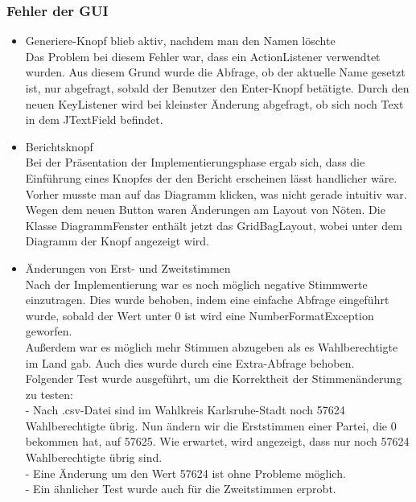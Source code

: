 \documentclass[12pt,a4paper,titlepage]{article}
\begin{document}
\subsubsection{Fehler der GUI}
\begin{itemize}
\item Generiere-Knopf blieb aktiv, nachdem man den Namen löschte \\
Das Problem bei diesem Fehler war, dass ein ActionListener verwendtet wurden. Aus diesem Grund wurde die
Abfrage, ob der aktuelle Name gesetzt ist, nur abgefragt, sobald der Benutzer den Enter-Knopf betätigte.
Durch den neuen KeyListener wird bei kleinster Änderung abgefragt, ob sich noch Text in dem JTextField befindet. \\

\item Berichtsknopf \\
Bei der Präsentation der Implementierungsphase ergab sich, dass die Einführung eines Knopfes der den Bericht erscheinen
lässt handlicher wäre. Vorher musste man auf das Diagramm klicken, was nicht gerade intuitiv war. \\
Wegen dem neuen Button waren Änderungen am Layout von Nöten. Die Klasse DiagrammFenster enthält jetzt das GridBagLayout,
wobei unter dem Diagramm der Knopf angezeigt wird. \\

\item Änderungen von Erst- und Zweitstimmen \\
Nach der Implementierung war es noch möglich negative Stimmwerte einzutragen. Dies wurde behoben, indem eine einfache Abfrage eingeführt wurde, sobald der Wert unter 0 ist wird eine NumberFormatException geworfen. \\
Außerdem war es möglich mehr Stimmen abzugeben als es Wahlberechtigte im Land gab. Auch dies wurde durch eine Extra-Abfrage behoben. \\
Folgender Test wurde ausgeführt, um die Korrektheit der Stimmenänderung zu testen:\\
- Nach .csv-Datei sind im Wahlkreis Karlsruhe-Stadt noch 57624 Wahlberechtigte übrig. Nun ändern wir die Erststimmen einer Partei, die 0 bekommen hat, auf 57625. Wie erwartet, wird angezeigt, dass nur noch 57624 Wahlberechtigte übrig sind. \\
- Eine Änderung um den Wert 57624 ist ohne Probleme möglich.\\
- Ein ähnlicher Test wurde auch für die Zweitstimmen erprobt.\\


\end{itemize}
\end{document}
